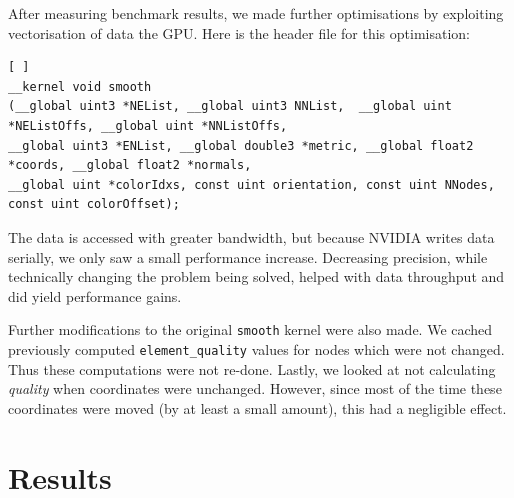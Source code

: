 \documentclass[a4paper,11pt, twocolumn]{article}
\begin{document}
After measuring benchmark results, we made further optimisations by exploiting vectorisation of data the GPU.  Here is the header file for this optimisation:
\begin{lstlisting}[ ]
__kernel void smooth
(__global uint3 *NEList, __global uint3 NNList,  __global uint *NEListOffs, __global uint *NNListOffs,
__global uint3 *ENList, __global double3 *metric, __global float2 *coords, __global float2 *normals,
__global uint *colorIdxs, const uint orientation, const uint NNodes, const uint colorOffset);
\end{lstlisting}
The data is accessed with greater bandwidth, but because NVIDIA writes data serially, we only saw a small performance increase.  Decreasing precision, while technically changing the problem being solved, helped with data throughput and did yield performance gains.

Further modifications to the original \verb+smooth+ kernel were also made.  We cached previously computed \verb+element_quality+ values for nodes which were not changed.  Thus these computations were not re-done.  Lastly, we looked at not calculating \emph{quality} when coordinates were unchanged.  However, since most of the time these coordinates were moved (by at least a small amount), this had a negligible effect.

\section{Results}


\end{document}

